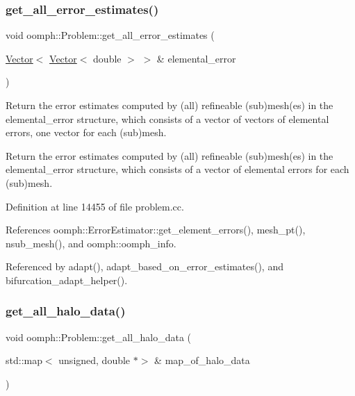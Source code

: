 \mbox{\label{classoomph_1_1Problem_a5e58bd6dcb1ff9ef54cf504984fb5f9e}} 
\subsubsection{\texorpdfstring{get\+\_\+all\+\_\+error\+\_\+estimates()}{get\_all\_error\_estimates()}}
{\footnotesize\ttfamily void oomph\+::\+Problem\+::get\+\_\+all\+\_\+error\+\_\+estimates (\begin{DoxyParamCaption}\item[{\hyperlink{classoomph_1_1Vector}{Vector}$<$ \hyperlink{classoomph_1_1Vector}{Vector}$<$ double $>$ $>$ \&}]{elemental\+\_\+error }\end{DoxyParamCaption})}



Return the error estimates computed by (all) refineable (sub)mesh(es) in the elemental\+\_\+error structure, which consists of a vector of vectors of elemental errors, one vector for each (sub)mesh. 

Return the error estimates computed by (all) refineable (sub)mesh(es) in the elemental\+\_\+error structure, which consists of a vector of elemental errors for each (sub)mesh. 

Definition at line 14455 of file problem.\+cc.



References oomph\+::\+Error\+Estimator\+::get\+\_\+element\+\_\+errors(), mesh\+\_\+pt(), nsub\+\_\+mesh(), and oomph\+::oomph\+\_\+info.



Referenced by adapt(), adapt\+\_\+based\+\_\+on\+\_\+error\+\_\+estimates(), and bifurcation\+\_\+adapt\+\_\+helper().

\mbox{\label{classoomph_1_1Problem_af071ecc4213ab3b2485d00c1c95420be}} 
\subsubsection{\texorpdfstring{get\+\_\+all\+\_\+halo\+\_\+data()}{get\_all\_halo\_data()}}
{\footnotesize\ttfamily void oomph\+::\+Problem\+::get\+\_\+all\+\_\+halo\+\_\+data (\begin{DoxyParamCaption}\item[{std\+::map$<$ unsigned, double $\ast$$>$ \&}]{map\+\_\+of\+\_\+halo\+\_\+data }\end{DoxyParamCaption})}




